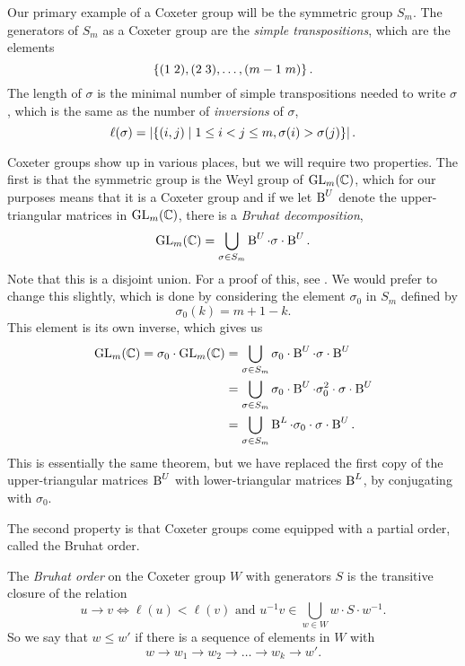 Our primary example of a Coxeter group will be the
symmetric group $S_m$.
The generators of $S_m$ as a Coxeter group are the \textit{simple
  transpositions}, which are the elements
\[ \left\{ (1\; 2), (2\; 3), \dots, (m-1 \; m)  \right\}. \]
The length of $\sigma$ is the minimal number of simple transpositions
needed to write $\sigma$, which is the same as the number of
\textit{inversions} of $\sigma$,
\[ \ell(\sigma) = \left| \left\{  (i,j) \mid 1\leq i < j\leq m, \sigma(i) >
  \sigma(j) \right\} \right|. \]

Coxeter groups show up in various places, but we will require two
properties. The first is that the symmetric group is the Weyl group of
$\operatorname{GL}_m(\mathbb{C})$, which for our purposes means that it is a Coxeter group
and if we let $\operatorname{B}^U$ denote the upper-triangular matrices in
$\operatorname{GL}_m(\mathbb{C})$, there is a \textit{Bruhat decomposition},
\[ \operatorname{GL}_m(\mathbb{C}) = \bigcup_{\sigma \in S_m} \operatorname{B}^U \cdot \sigma \cdot \operatorname{B}^U. \]
Note that this is a disjoint union. For a proof of this, see
\cite[Theorem 4.3]{hiller}. We
would prefer to change this slightly, which is done by considering the
element $\sigma_0$ in $S_m$ defined by
\[ \sigma_0(k) = m+1-k. \]
This element is its own inverse, which gives us
\begin{align*}
  \operatorname{GL}_m(\mathbb{C}) = \sigma_0 \cdot \operatorname{GL}_m(\mathbb{C}) &= \bigcup_{\sigma\in S_m}
                                         \sigma_0\cdot \operatorname{B}^U \cdot
                                         \sigma\cdot \operatorname{B}^U \\
                                       &= \bigcup_{\sigma\in S_m}
                                         \sigma_0\cdot \operatorname{B}^U \cdot
                                         \sigma_0^2\cdot \sigma \cdot
                                         \operatorname{B}^U \\
                                       &= \bigcup_{\sigma\in S_m}
                                         \operatorname{B}^L\cdot \sigma_0\cdot
                                         \sigma\cdot \operatorname{B}^U.
\end{align*}
This is essentially the same theorem, but we have replaced the first
copy of the upper-triangular matrices $\operatorname{B}^U$ with lower-triangular
matrices $\operatorname{B}^L$, by
conjugating with $\sigma_0$.

The second property is that Coxeter groups come equipped with a
partial order, called the Bruhat order.
\begin{definition}
  \label{def:bruhat-def}
  The \textit{Bruhat order} on the Coxeter group $W$ with generators
  $S$ is the transitive closure of the relation
  \[ u \to v \iff \ell(u) < \ell(v) \text{ and } u^{-1}v \in
  \bigcup_{w\in W} w
  \cdot S \cdot w^{-1}. \]
  So we say that $w \leq w'$ if there is a sequence of elements in $W$
  with
  \[ w \to w_1 \to w_2 \to \dots \to w_k \to w'. \]
\end{definition}

